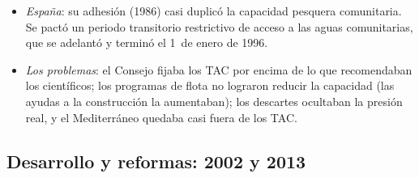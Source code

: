 \documentclass[11pt]{article}
\begin{document}
\begin{itemize}
\begin{itemize}
  \item \emph{exterior}: acuerdos con terceros países (de reciprocidad, como con Noruega; con contrapartida financiera, sobre todo con países africanos) y participación en las organizaciones regionales de ordenación pesquera (OROP).
  \end{itemize}
\item \emph{España}: su adhesión (1986) casi duplicó la capacidad pesquera comunitaria. Se pactó un periodo transitorio restrictivo de acceso a las aguas comunitarias, que se adelantó y terminó el 1~de enero de 1996\nocite{UE1994Integracion}.
\item \emph{Los problemas}: el Consejo fijaba los TAC por encima de lo que recomendaban los científicos; los programas de flota no lograron reducir la capacidad (las ayudas a la construcción la aumentaban); los descartes ocultaban la presión real, y el Mediterráneo quedaba casi fuera de los TAC.
\end{itemize}

\subsection{Desarrollo y reformas: 2002 y 2013}\label{sec:ppc-reformas}
\end{document}
